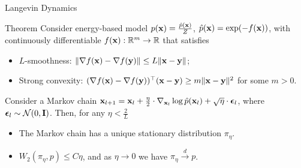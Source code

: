 \documentclass{beamer}
\begin{document}
\begin{frame}{Langevin Dynamics}
	\begin{block}{Theorem}
		Consider energy-based model $p(\mathbf{x}) = \frac{\hat{p}(\mathbf{x})}{Z}$, $\hat{p}(\mathbf{x}) = \exp(-f(\mathbf{x}))$, with continuously differentiable $f(\mathbf{x}): \mathbb{R}^m \rightarrow \mathbb{R}$ that satisfies
		\begin{itemize}
			\item $L$-smoothness: $\| \nabla f(\mathbf{x}) - \nabla f(\mathbf{y})\| \leq L \|\mathbf{x} - \mathbf{y} \|$;
			\item Strong convexity: $(\nabla f(\mathbf{x}) - \nabla f(\mathbf{y}))^\top(\mathbf{x} - \mathbf{y}) \geq m \| \mathbf{x} - \mathbf{y} \|^2 $ for some $m > 0$.
		\end{itemize}
		Consider a Markov chain $\mathbf{x}_{l + 1} = \mathbf{x}_l + \frac{\eta}{2} \cdot \nabla_{\mathbf{x}_l} \log \hat{p}(\mathbf{x}_l) + \sqrt{\eta} \cdot \boldsymbol{\epsilon}_l$, where $\boldsymbol{\epsilon}_l \sim \mathcal{N}(0, \mathbf{I})$.
		Then, for any $\eta < \frac{2}{L}$
		\begin{itemize}
			\item The Markov chain has a unique stationary distribution $\pi_\eta$.
			\item $W_2(\pi_\eta, p) \le C \eta$, and as $\eta \to 0$ we have $\pi_\eta \xrightarrow{d} p$.
		\end{itemize}
	\end{block}
\end{frame}
\end{document}
